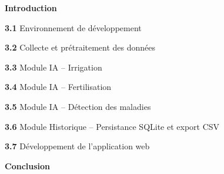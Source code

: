\documentclass[12pt,a4paper]{report}
\begin{document}
	\vspace{3pt}
	\begin{list}{}{%
			\setlength{\leftmargin}{0pt}
			\setlength{\itemsep}{2pt}
		}
		\item \textbf{Introduction} \dotfill
		
		\vspace{4pt}
		\item \textbf{3.1} \quad Environnement de d\'eveloppement \dotfill
		
		\vspace{4pt}
		\item \textbf{3.2} \quad Collecte et pr\'etraitement des donn\'ees \dotfill
		
		\vspace{4pt}
		\item \textbf{3.3} \quad Module IA -- Irrigation \dotfill
		
		\vspace{4pt}
		\item \textbf{3.4} \quad Module IA -- Fertilisation \dotfill
		
		\vspace{4pt}
		\item \textbf{3.5} \quad Module IA -- D\'etection des maladies \dotfill
		
		\vspace{4pt}
		\item \textbf{3.6} \quad Module Historique -- Persistance SQLite et export CSV \dotfill
		
		\vspace{4pt}
		\item \textbf{3.7} \quad D\'eveloppement de l'application web \dotfill
		
		\vspace{4pt}
		\item \textbf{Conclusion} \dotfill
	\end{list}
	
	\vspace{0.8cm}
	
	
	\noindent
	\colorbox{bleuPrincipal}{%
		\parbox{\linewidth}{%
			\vspace{3pt}
			\hfill{\color{white}\bfseries }
			\vspace{3pt}
		}%
	}
	
\end{document}
